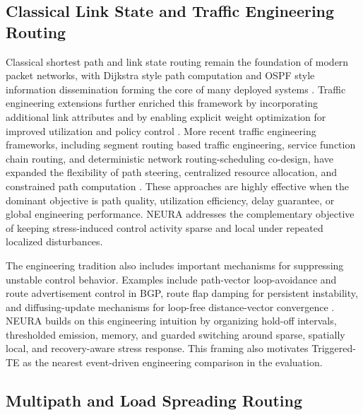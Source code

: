 \documentclass[5p,times]{elsarticle}
\begin{document}
\subsection{Classical Link State and Traffic Engineering Routing}

Classical shortest path and link state routing remain the foundation of modern packet networks, with Dijkstra style path computation and OSPF style information dissemination forming the core of many deployed systems \cite{dijkstra1959note,moy1998ospf}. Traffic engineering extensions further enriched this framework by incorporating additional link attributes and by enabling explicit weight optimization for improved utilization and policy control \cite{katz2003ospfte,fortz2000ospfweights,fortz2002changingworld}. More recent traffic engineering frameworks, including segment routing based traffic engineering, service function chain routing, and deterministic network routing-scheduling co-design, have expanded the flexibility of path steering, centralized resource allocation, and constrained path computation \cite{wu2023srte,wang2025rs4sr,liu2024lpulse,zheng2024tsn,wang2025wtsn}. These approaches are highly effective when the dominant objective is path quality, utilization efficiency, delay guarantee, or global engineering performance. NEURA addresses the complementary objective of keeping stress-induced control activity sparse and local under repeated localized disturbances.

The engineering tradition also includes important mechanisms for suppressing unstable control behavior. Examples include path-vector loop-avoidance and route advertisement control in BGP, route flap damping for persistent instability, and diffusing-update mechanisms for loop-free distance-vector convergence \cite{rekhter2006bgp4,villamizar1998rfd,garcialuna1989dual}. NEURA builds on this engineering intuition by organizing hold-off intervals, thresholded emission, memory, and guarded switching around sparse, spatially local, and recovery-aware stress response. This framing also motivates Triggered-TE as the nearest event-driven engineering comparison in the evaluation.

\subsection{Multipath and Load Spreading Routing}
\end{document}
